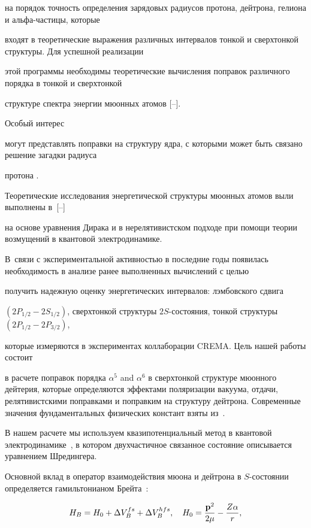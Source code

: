 на порядок точность определения зарядовых радиусов протона, дейтрона, гелиона и альфа-частицы, которые

входят в теоретические выражения различных интервалов тонкой и сверхтонкой структуры. Для успешной реализации

этой программы необходимы теоретические вычисления поправок различного порядка в тонкой и сверхтонкой

структуре спектра энергии мюонных атомов [--]. 

Особый интерес

могут представлять поправки на структуру ядра, с которыми может быть связано решение загадки радиуса

протона \cite{CREMA,structure}.



Теоретические исследования энергетической структуры мюонных атомов выли выполнены в~[--]

на основе уравнения Дирака и в нерелятивистском подходе при помощи теории возмущений в квантовой электродинамике.

В~связи с экспериментальной активностью в последние годы появилась необходимость в анализе ранее выполненных вычислений с целью

получить надежную оценку энергетических интервалов: лэмбовского сдвига

\mbox{$(2P_{1/2}{-}2S_{1/2})$}, сверхтонкой структуры $2S$-состояния, тонкой структуры $(2P_{1/2}-2P_{3/2})$,

которые измеряются в экспериментах коллаборации CREMA. Цель нашей работы состоит

в расчете поправок порядка $\alpha^5$ and $\alpha^6$ в сверхтонкой структуре мюонного дейтерия, которые определяются эффектами поляризации вакуума, отдачи, релятивистскими поправками и поправким на структуру дейтрона. Современные значения фундаментальных физических констант взяты из~\cite{MT}.



В нашем расчете мы используем квазипотенциальный метод в квантовой электродинамике~\cite{faustov}, в котором двухчастичное связанное состояние описывается уравнением Шредингера.

Основной вклад в оператор взаимодействия мюона и дейтрона в $S$-состоянии определяется гамильтонианом Брейта~\cite{t4}:

\begin{equation}

\label{eq:breit}

H_B=H_0+\Delta V_B^{fs}+\Delta V_B^{hfs},\quad H_0=\frac{{\bf p}^2}{2\mu}-\frac{Z\alpha}{r},

\end{equation}

